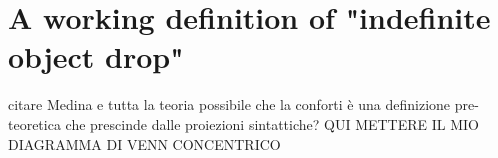 


\section{A working definition of "indefinite object drop"} 

citare Medina e tutta la teoria possibile che la conforti
è una definizione pre-teoretica che prescinde dalle proiezioni sintattiche?
QUI METTERE IL MIO DIAGRAMMA DI VENN CONCENTRICO



